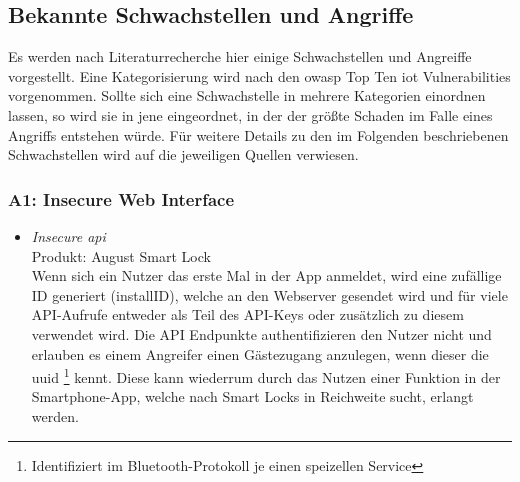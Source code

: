 \subsection{Bekannte Schwachstellen und Angriffe}
\label{sec:analysis_vulns}
    Es werden nach Literaturrecherche hier einige Schwachstellen und Angreiffe vorgestellt. 
    Eine Kategorisierung wird nach den \gls{owasp} Top Ten \gls{iot} Vulnerabilities\cite{Miessler2015} vorgenommen. 
    Sollte sich eine Schwachstelle in mehrere Kategorien einordnen lassen, so wird sie in jene eingeordnet, in der der größte Schaden im Falle eines Angriffs entstehen würde. 
    Für weitere Details zu den im Folgenden beschriebenen Schwachstellen wird auf die jeweiligen Quellen verwiesen.
    
    \subsubsection*{A1: Insecure Web Interface}
       \begin{itemize}[leftmargin=0cm,label={}]
            \item \emph{Insecure \gls{api}}\cite{Fuller2017,Lariviere2015}\label{vuln:userenum}\\
                Produkt: August Smart Lock\\
                Wenn sich ein Nutzer das erste Mal in der App anmeldet, wird eine zufällige ID generiert (installID), welche an den Webserver gesendet wird und für viele API-Aufrufe entweder als Teil des API-Keys oder zusätzlich zu diesem verwendet wird. 
                Die API Endpunkte authentifizieren den Nutzer nicht und erlauben es einem Angreifer einen Gästezugang anzulegen, wenn dieser die \gls{uuid}
                \!\footnote{Identifiziert im Bluetooth-Protokoll je einen speizellen Service}
                kennt.
                Diese kann wiederrum durch das Nutzen einer Funktion in der Smartphone-App, welche nach Smart Locks in Reichweite sucht, erlangt werden. 
       \end{itemize} 
       
